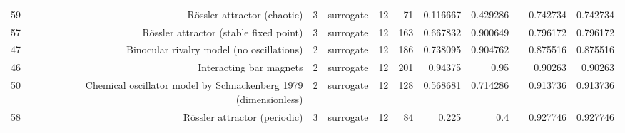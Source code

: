 \begin{table}[htbp]
\begin{tabular}{lrrrrrrrrrr}
59 & Rössler attractor (chaotic) & 3 & surrogate & 12 & 71 & 0.116667 & 0.429286 &  & 0.742734 & 0.742734 \\
57 & Rössler attractor (stable fixed point) & 3 & surrogate & 12 & 163 & 0.667832 & 0.900649 &  & 0.796172 & 0.796172 \\
47 & Binocular rivalry model (no oscillations) & 2 & surrogate & 12 & 186 & 0.738095 & 0.904762 &  & 0.875516 & 0.875516 \\
46 & Interacting bar magnets & 2 & surrogate & 12 & 201 & 0.94375 & 0.95 &  & 0.90263 & 0.90263 \\
50 & Chemical oscillator model by Schnackenberg 1979 (dimensionless) & 2 & surrogate & 12 & 128 & 0.568681 & 0.714286 &  & 0.913736 & 0.913736 \\
58 & Rössler attractor (periodic) & 3 & surrogate & 12 & 84 & 0.225 & 0.4 &  & 0.927746 & 0.927746 \\
\bottomrule
\end{tabular}
\end{table}
